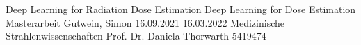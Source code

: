 \documentclass[12pt, oneside]{article}
\begin{document}
\renewcommand{\tableautorefname}{tab.}
\renewcommand{\figureautorefname}{fig.}
\renewcommand{\equationautorefname}{eq.}

\titlespacing{\section}{0pt}{6pt}{12pt}
\titlespacing{\subsection}{0pt}{6pt}{6pt}
\titlespacing{\subsubsection}{0pt}{6pt}{6pt}

\Titlepage
    {Deep Learning for Radiation Dose Estimation}   %
    {Deep Learning for Dose Estimation}             %
    {Masterarbeit}                                  %
    {Gutwein, Simon}                                %
    {16.09.2021}                                    %
    {16.03.2022}                                    %
    {Medizinische Strahlenwissenschaften}           %
    {Prof. Dr. Daniela Thorwarth}                   %
    {5419474}                                       %


\newpage
{}

\Abstract

\tableofcontents


\newpage

\listoffigures
{}%



\newpage
\end{document}
